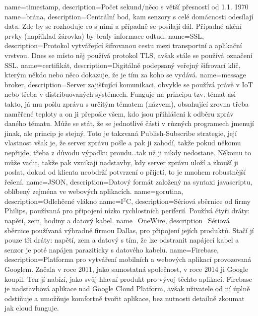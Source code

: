 {
  name={timestamp},
  description={Počet sekund/něco s větší přesností od 1.1. 1970}
}
{
  name={brána},
  description={Centrální bod, kam senzory s celé domácnosti odesílají data. Zde by se rozhoduje co s nimi a případně se 
  posílají dál. Případné akční prvky (například žárovka) by braly informace odtud.}
}
{
  name={SSL},
  description={Protokol vytvářející šifrovanou cestu mezi transportní a aplikační vrstvou. Dnes se místo něj používá 
  protokol TLS, avšak stále se používá označení SSL.}
}
{
  name={certifikát},
  description={Digitálně podepsaný veřejný šifrovací klíč, kterým někdo nebo něco dokazuje, že je tím za koho se 
  vydává.}
}
{
  name={message broker},
  description={Server zajišťující komunikaci, obvykle se používá právě v IoT nebo třeba v distribuovaných systémech. 
    Funguje na principu tzv. témat asi takto, já mu pošlu zprávu s určitým tématem (názvem), obsahující zrovna třeba 
    naměřené teploty a on ji přepošle všem, kdo jsou přihlášeni k odběru zpráv daného tématu. Může se stát, že se 
    jednotlivé části v různých programech jmenují jinak, ale princip je stejný. Toto je takzvaná Publish-Subscribe 
    strategie, její vlastnost však je, že server zprávu pošle a pak ji zahodí, takže pokud někomu nepřijde, třeba 
    z důvodu výpadku proudu\ldots tak už ji nikdy nedostane. Někomu to může vadit, takže pak vznikají nadstavby, kdy 
    server zprávu uloží a zkouší ji poslat, dokud od klienta neobdrží potvrzení o přijetí, to je mnohem robustnější 
  řešení.}
}
{
  name={JSON},
  description={Datový formát založený na syntaxi javascriptu, oblíbený zejména ve webových aplikacích.}
}
{
  name={gorutina},
  description={Odlehčené vlákno}
}
{
  name={I$^2$C},
  description={Sériová sběrnice od firmy Philips, používaná pro připojení nízko rychlostních periferií. Používá čtyři 
  dráty: napětí, zem, hodiny a datový kabel.}
}
{
  name={OneWire},
  description={Sériová sběrnice používaná výhradně firmou Dallas, pro připojení jejích produktů. Stačí jí pouze tři 
  dráty: napětí, zem a datový s tím, že lze odstranit napájecí kabel a senzor je poté napájen paraziticky s datového 
kabelu.}
}
{
  name={Firebase},
  description={Platforma pro vytváření mobilních a webových aplikací provozovaná Googlem. Začala v roce 2011, jako 
    samostatná společnost, v roce 2014 ji Google koupil. Ten jí nabízí, jako svůj hlavní produkt pro vývoj těchto 
    aplikací. Firebase je nadstavbová aplikace nad Google Cloud Platform, avšak uživatele od ní úplně odstiňuje 
    a umožňuje komfortně tvořit aplikace, bez nutnosti detailně zkoumat jak cloud funguje.}
}
